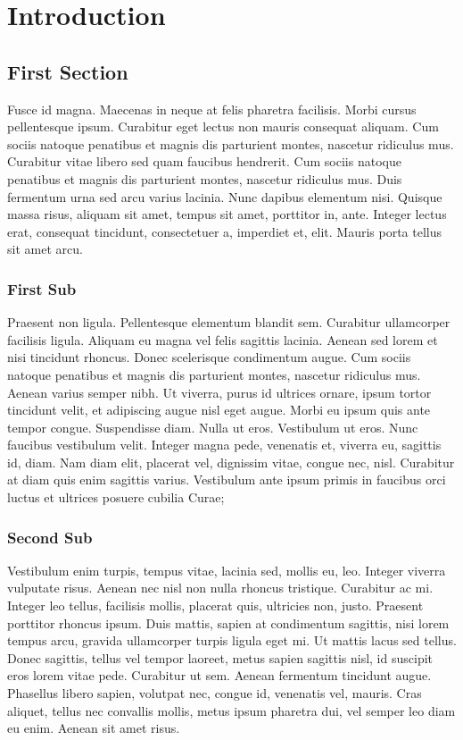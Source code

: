 \chapter{Introduction}
\section{First Section}
Fusce id magna. Maecenas in neque at felis pharetra facilisis. Morbi cursus pellentesque ipsum. Curabitur eget lectus non mauris consequat aliquam. Cum sociis natoque penatibus et magnis dis parturient montes, nascetur ridiculus mus. Curabitur vitae libero sed quam faucibus hendrerit. Cum sociis natoque penatibus et magnis dis parturient montes, nascetur ridiculus mus. Duis fermentum urna sed arcu varius lacinia. Nunc dapibus elementum nisi. Quisque massa risus, aliquam sit amet, tempus sit amet, porttitor in, ante. Integer lectus erat, consequat tincidunt, consectetuer a, imperdiet et, elit. Mauris porta tellus sit amet arcu.

\subsection{First Sub}
Praesent non ligula. Pellentesque elementum blandit sem. Curabitur ullamcorper facilisis ligula. Aliquam eu magna vel felis sagittis lacinia. Aenean sed lorem et nisi tincidunt rhoncus. Donec scelerisque condimentum augue. Cum sociis natoque penatibus et magnis dis parturient montes, nascetur ridiculus mus. Aenean varius semper nibh. Ut viverra, purus id ultrices ornare, ipsum tortor tincidunt velit, et adipiscing augue nisl eget augue. Morbi eu ipsum quis ante tempor congue. Suspendisse diam. Nulla ut eros. Vestibulum ut eros. Nunc faucibus vestibulum velit. Integer magna pede, venenatis et, viverra eu, sagittis id, diam. Nam diam elit, placerat vel, dignissim vitae, congue nec, nisl. Curabitur at diam quis enim sagittis varius. Vestibulum ante ipsum primis in faucibus orci luctus et ultrices posuere cubilia Curae;

\subsection{Second Sub}
Vestibulum enim turpis, tempus vitae, lacinia sed, mollis eu, leo. Integer viverra vulputate risus. Aenean nec nisl non nulla rhoncus tristique. Curabitur ac mi. Integer leo tellus, facilisis mollis, placerat quis, ultricies non, justo. Praesent porttitor rhoncus ipsum. Duis mattis, sapien at condimentum sagittis, nisi lorem tempus arcu, gravida ullamcorper turpis ligula eget mi. Ut mattis lacus sed tellus. Donec sagittis, tellus vel tempor laoreet, metus sapien sagittis nisl, id suscipit eros lorem vitae pede. Curabitur ut sem. Aenean fermentum tincidunt augue. Phasellus libero sapien, volutpat nec, congue id, venenatis vel, mauris. Cras aliquet, tellus nec convallis mollis, metus ipsum pharetra dui, vel semper leo diam eu enim. Aenean sit amet risus.

